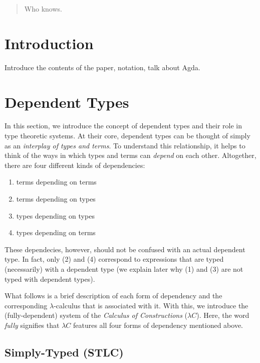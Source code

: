 \documentclass[12pt]{article}
\begin{document}
\maketitle

\begin{abstract}
  Who knows.
\end{abstract}

\section{Introduction}
Introduce the contents of the paper, notation, talk about Agda.

\section{Dependent Types}
In this section, we introduce the concept of dependent types and their role in
type theoretic systems. At their core, dependent types can be thought of simply
as an \textit{interplay of types and terms}. To understand this relationship,
it helps to think of the ways in which types and terms can \textit{depend} on
each other. Altogether, there are four different kinds of dependencies:

\begin{enumerate}
\item terms depending on terms
\item terms depending on types
\item types depending on types
\item types depending on terms
\end{enumerate}
These dependecies, however, should not be confused with an actual dependent type.
In fact, only (2) and (4) correspond to expressions that are typed (necessarily)
with a dependent type (we explain later why (1) and (3) are not typed with
dependent types).

What follows is a brief description of each form of dependency and the
corresponding \(\lambda\)-calculus that is associated with it. With this, we
introduce the (fully-dependent) system of the \textit{Calculus of Constructions}
(\(\lambda C\)). Here, the word \textit{fully} signifies that \(\lambda C\)
features all four forms of dependency mentioned above.

\subsection*{Simply-Typed (STLC)}
\end{document}
